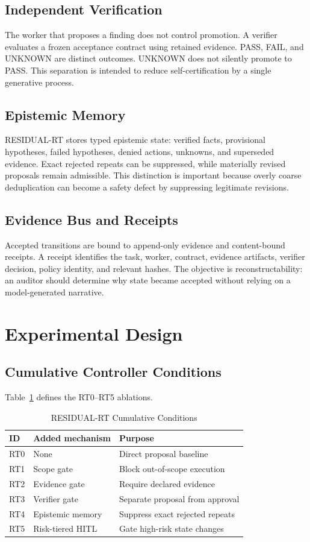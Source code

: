 \documentclass[conference]{IEEEtran}
\begin{document}
\subsection{Independent Verification}
The worker that proposes a finding does not control promotion. A verifier evaluates a frozen acceptance contract using retained evidence. PASS, FAIL, and UNKNOWN are distinct outcomes. UNKNOWN does not silently promote to PASS. This separation is intended to reduce self-certification by a single generative process.

\subsection{Epistemic Memory}
RESIDUAL-RT stores typed epistemic state: verified facts, provisional hypotheses, failed hypotheses, denied actions, unknowns, and superseded evidence. Exact rejected repeats can be suppressed, while materially revised proposals remain admissible. This distinction is important because overly coarse deduplication can become a safety defect by suppressing legitimate revisions.

\subsection{Evidence Bus and Receipts}
Accepted transitions are bound to append-only evidence and content-bound receipts. A receipt identifies the task, worker, contract, evidence artifacts, verifier decision, policy identity, and relevant hashes. The objective is reconstructability: an auditor should determine why state became accepted without relying on a model-generated narrative.

\section{Experimental Design}
\subsection{Cumulative Controller Conditions}
Table~\ref{tab:conditions} defines the RT0--RT5 ablations.

\begin{table}[ht]
\centering
\caption{RESIDUAL-RT Cumulative Conditions}
\label{tab:conditions}
\begin{tabular}{lll}
\toprule
ID & Added mechanism & Purpose \\
\midrule
RT0 & None & Direct proposal baseline \\
RT1 & Scope gate & Block out-of-scope execution \\
RT2 & Evidence gate & Require declared evidence \\
RT3 & Verifier gate & Separate proposal from approval \\
RT4 & Epistemic memory & Suppress exact rejected repeats \\
RT5 & Risk-tiered HITL & Gate high-risk state changes \\
\bottomrule
\end{tabular}
\end{table}
\end{document}
